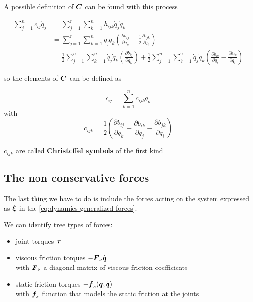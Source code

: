A possible definition of $\boldsymbol{C}$ can be found with this process

\begin{align*}
    \sum_{j=1}^n c_{ij} \dot{q}_j &= \sum_{j=1}^n \sum_{k=1}^n h_{ijk} \dot{q}_j \dot{q}_k \\
    &= \sum_{j=1}^n \sum_{k=1}^n  \dot{q}_j \dot{q}_k \left( \frac{\partial b_{ij}}{\partial q_k} - \frac{1}{2} \frac{\partial b_{jk}}{\partial q_i} \right) \\
    &= \frac{1}{2} \sum_{j=1}^n \sum_{k=1}^n  \dot{q}_j \dot{q}_k \left( \frac{\partial b_{ij}}{\partial q_k} \right) +
    \frac{1}{2} \sum_{j=1}^n \sum_{k=1}^n  \dot{q}_j \dot{q}_k \left( \frac{\partial b_{ik}}{\partial q_j} - \frac{\partial b_{jk}}{\partial q_i} \right)
\end{align*}

so the elements of $\boldsymbol{C}$ can be defined as

\begin{equation}
    c_{ij} = \sum_{k=1}^n c_{ijk}\dot{q}_k \label{eq:matrix-c-coefficients}
\end{equation}
with
\[
	c_{ijk} = \frac{1}{2} \left( \frac{\partial b_{ij}}{\partial q_k} + \frac{\partial b_{ik}}{\partial q_j} - \frac{\partial b_{jk}}{\partial q_i} \right)
\]

$c_{ijk}$ are called \textbf{Christoffel symbols} of the first kind

\subsection{The non conservative forces}

The last thing we have to do is include the forces acting on the system expressed as $\boldsymbol{\xi}$ in the \autoref{eq:dynamics-generalized-forces}.

We can identify tree types of forces:

\begin{itemize}
	\item joint torques $\boldsymbol{\tau}$
	\item viscous friction torques $-\boldsymbol{F}_\nu\dot{\boldsymbol{q}}$ \\
		with $\boldsymbol{F}_\nu$ a diagonal matrix of viscous friction coefficients
	\item static friction torques $-\boldsymbol{f}_s(\boldsymbol{q},\dot{\boldsymbol{q}})$ \\
		with $\boldsymbol{f}_s$ function that models the static friction at the joints
\end{itemize}

